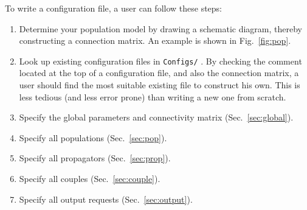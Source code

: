 \documentclass[12pt,a4paper]{article}
\newcommand{\type}[1]{ {\small\small\tt #1} }
\begin{document}
To write a configuration file, a user can follow these steps:
\begin{enumerate}
\item Determine your population model by drawing a schematic diagram, thereby constructing a connection matrix. An example is shown in Fig.~\ref{fig:pop}.
\item Look up existing configuration files in \type{Configs/}. By checking the comment located at the top of a configuration file, and also the connection matrix, a user should find the most suitable existing file to construct his own. This is less tedious (and less error prone) than writing a new one from scratch.
\item Specify the global parameters and connectivity matrix (Sec.~\ref{sec:global}).
\item Specify all populations (Sec.~\ref{sec:pop}).
\item Specify all propagators (Sec.~\ref{sec:prop}).
\item Specify all couples (Sec.~\ref{sec:couple}).
\item Specify all output requests (Sec.~\ref{sec:output}).
\end{enumerate}
\end{document}

